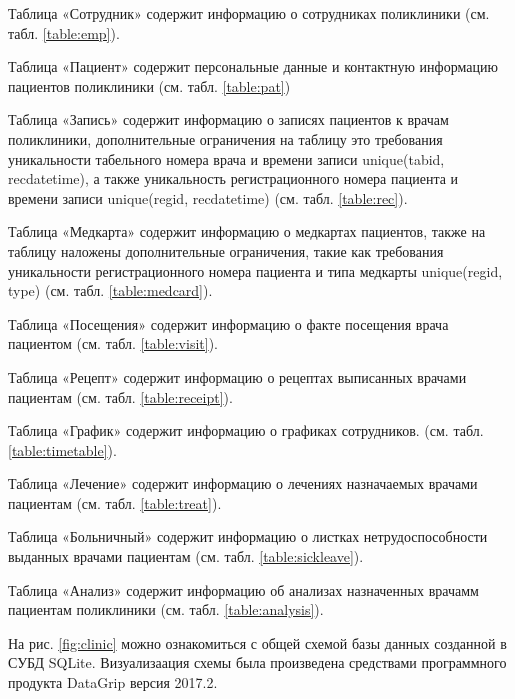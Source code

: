 \documentclass[14pt,a4paper,russian]{extreport}
\begin{document}
\vfill
Таблица «Сотрудник» содержит информацию о сотрудниках поликлиники (см. табл. \ref{table:emp}).\par
Таблица «Пациент» содержит персональные данные и контактную информацию пациентов поликлиники (см. табл.
\ref{table:pat})\par
Таблица «Запись» содержит информацию о записях пациентов к врачам поликлиники,
дополнительные ограничения на таблицу это требования уникальности табельного номера врача и времени
записи unique(tabid, recdatetime), а также уникальность регистрационного номера пациента и времени
записи unique(regid, recdatetime) (см. табл. \ref{table:rec}).\par
Таблица «Медкарта» содержит информацию о медкартах пациентов, также на таблицу наложены дополнительные ограничения, такие как
требования уникальности регистрационного номера пациента и типа медкарты unique(regid, type) (см. табл.
\ref{table:medcard}).\par
Таблица «Посещения» содержит информацию о факте посещения врача пациентом (см. табл.
\ref{table:visit}).\par
Таблица «Рецепт» содержит информацию о рецептах выписанных врачами пациентам (см. табл.
\ref{table:receipt}).\par
Таблица «График» содержит информацию о графиках сотрудников.
(см. табл. \ref{table:timetable}).\par
Таблица «Лечение» содержит информацию о лечениях назначаемых врачами пациентам (см. табл.
\ref{table:treat}).\par
Таблица «Больничный» содержит информацию о листках нетрудоспособности выданных врачами пациентам
(см. табл. \ref{table:sickleave}).\par
Таблица «Анализ» содержит информацию об анализах назначенных врачамм пациентам поликлиники (см.
табл. \ref{table:analysis}).\par


На рис. \ref{fig:clinic} можно ознакомиться с общей схемой базы данных созданной в СУБД SQLite. Визуализаация схемы была
произведена средствами программного продукта DataGrip версия 2017.2.
\end{document}

